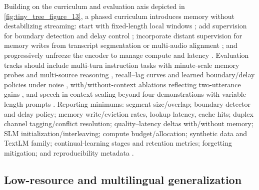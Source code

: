 \documentclass{article}
\begin{document}
Building on the curriculum and evaluation axis depicted in \autoref{fig:tiny_tree_figure_13}, a phased curriculum introduces memory without destabilizing streaming: start with fixed-length local windows \cite{hsu2024exploringcontextlearningtextlessspeechla}; add supervision for boundary detection and delay control \cite{guo2025streamuniachievingstreamingspeechtransla}; incorporate distant supervision for memory writes from transcript segmentation or multi-audio alignment \cite{huang2025dynamicsuperbphase2collaborativelyexpand}; and progressively unfreeze the encoder to manage compute and latency \cite{nguyen2025qwenvsgemmaintegrationwhispercomparative}. Evaluation tracks should include multi-turn instruction tasks with minute-scale memory probes and multi-source reasoning \cite{huang2025dynamicsuperbphase2collaborativelyexpand}, recall--lag curves and learned boundary/delay policies under noise \cite{guo2025streamuniachievingstreamingspeechtransla}, with/without-context ablations reflecting two-utterance gains \cite{li2025seewossubmissionmlcslmlessonslearnedspee}, and speech in-context scaling beyond four demonstrations with variable-length prompts \cite{hsu2024exploringcontextlearningtextlessspeechla}. Reporting minimums: segment size/overlap; boundary detector and delay policy; memory write/eviction rates, lookup latency, cache hits; duplex channel tagging/conflict resolution; quality--latency deltas with/without memory; SLM initialization/interleaving; compute budget/allocation; synthetic data and TextLM family; continual-learning stages and retention metrics; forgetting mitigation; and reproducibility metadata \cite{maimon2025scalinganalysisinterleavedspeechtextlang,hsiao2025analyzingmitigationstrategiescatastrophi,chen2023reducingbarriersselfsupervisedlearninghu}.

\subsection{Low-resource and multilingual generalization} \label{subsec:Low-resource and multilingual generalization}
\end{document}
